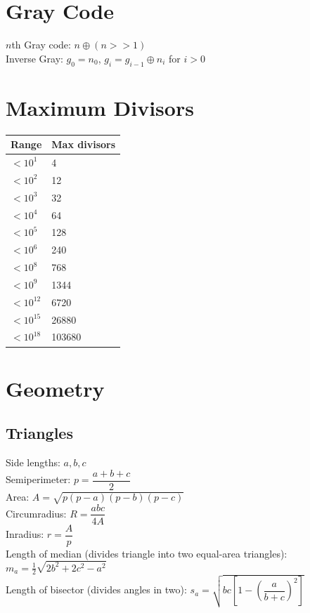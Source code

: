 \section{Gray Code}
$n$th Gray code: $n \oplus (n >> 1)$ \\
Inverse Gray: $g_0 = n_0$, $g_i = g_{i-1} \oplus n_i$ for $i > 0$

\section{Maximum Divisors}
\begin{center}
\begin{tabular}{l|l}
Range & Max divisors \\ \hline
$< 10^1$ & 4 \\
$< 10^2$ & 12 \\
$< 10^3$ & 32 \\
$< 10^4$ & 64 \\
$< 10^5$ & 128 \\
$< 10^6$ & 240 \\
$< 10^8$ & 768 \\
$< 10^9$ & 1344 \\
$< 10^{12}$ & 6720 \\
$< 10^{15}$ & 26880 \\
$< 10^{18}$ & 103680 \\
\end{tabular}
\end{center}

\section{Geometry}

\subsection{Triangles}
Side lengths: $a,b,c$\\
Semiperimeter: $p=\dfrac{a+b+c}{2}$\\
Area: $A=\sqrt{p(p-a)(p-b)(p-c)}$\\
Circumradius: $R=\dfrac{abc}{4A}$\\
Inradius: $r=\dfrac{A}{p}$\\
Length of median (divides triangle into two equal-area triangles): $m_a=\tfrac{1}{2}\sqrt{2b^2+2c^2-a^2}$\\
Length of bisector (divides angles in two): $s_a=\sqrt{bc\left[1-\left(\dfrac{a}{b+c}\right)^2\right]}$\\


